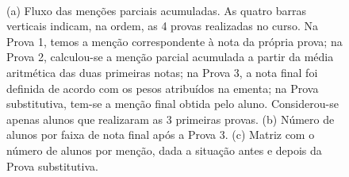 \documentclass[a4paper]{report}
\begin{document}
\begin{figure} 
    \centering
  \\
\caption{(a) Fluxo das menções parciais acumuladas. As quatro barras verticais indicam, na ordem, as 4 provas realizadas no curso. 
Na Prova 1, temos a menção correspondente à nota da própria prova; na Prova 2, calculou-se a menção parcial acumulada a partir da média aritmética das duas primeiras notas; na Prova 3, a nota final foi definida de acordo com os pesos atribuídos na ementa; na Prova substitutiva, tem-se a menção final obtida pelo aluno. Considerou-se apenas alunos que realizaram as 3 primeiras provas. (b) Número de alunos por faixa de nota final após a Prova 3. (c) Matriz com o número de alunos por menção, dada a situação antes e depois da Prova substitutiva.}
\label{fig:notas_cursos}
\end{figure}
\end{document}
